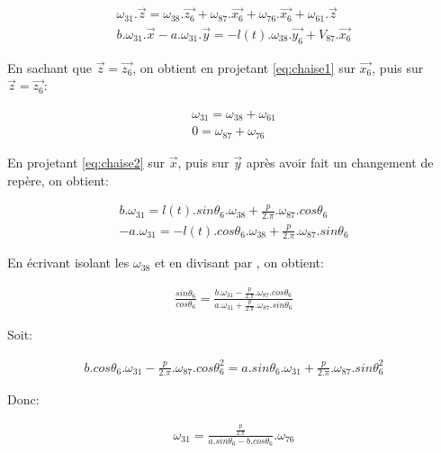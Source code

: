\begin{eqnarray}
\omega_{31}.\overrightarrow{z}=\omega_{38}.\overrightarrow{z_6}+\omega_{87}.\overrightarrow{x_6}+\omega_{76}.\overrightarrow{x_6}+\omega_{61}.\overrightarrow{z} \label{eq:chaise1} \\
b.\omega_{31}.\overrightarrow{x}-a.\omega_{31}.\overrightarrow{y}=-l(t).\omega_{38}.\overrightarrow{y_6}+V_{87}.\overrightarrow{x_6} \label{eq:chaise2} 
\end{eqnarray}

En sachant que $\overrightarrow{z}=\overrightarrow{z_6}$, on obtient en projetant \ref{eq:chaise1} sur $\overrightarrow{x_6}$, puis sur $\overrightarrow{z}=\overrightarrow{z_6}$:

\begin{eqnarray}
\omega_{31}=\omega_{38}+\omega_{61} \label{eq:chaise3} \\
0=\omega_{87}+\omega_{76} \label{eq:chaise4} 
\end{eqnarray}

En projetant \ref{eq:chaise2} sur $\overrightarrow{x}$, puis sur $\overrightarrow{y}$ après avoir fait un changement de repère, on obtient:

\begin{eqnarray}
b.\omega_{31}=l(t).sin\theta_6.\omega_{38}+\frac{p}{2.\pi}.\omega_{87}.cos\theta_6 \label{eq:chaise5} \\
-a.\omega_{31}=-l(t).cos\theta_6.\omega_{38}+\frac{p}{2.\pi}.\omega_{87}.sin\theta_6 \label{eq:chaise6}
\end{eqnarray}

En écrivant isolant les $\omega_{38}$ et en divisant \label{eq:chaise5} par \label{eq:chaise6}, on obtient:

\begin{eqnarray}
\frac{sin \theta_6}{cos \theta_6}=\frac{b.\omega_{31}-\frac{p}{2.\pi}.\omega_{87}.cos\theta_6 }{a.\omega_{31}+\frac{p}{2.\pi}.\omega_{87}.sin\theta_6} \label{eq:chaise7}
\end{eqnarray}

Soit:

\begin{eqnarray}
b.cos \theta_6.\omega_{31}-\frac{p}{2.\pi}.\omega_{87}.cos\theta_6^2=a.sin \theta_6.\omega_{31}+\frac{p}{2.\pi}.\omega_{87}.sin\theta_6^2 \label{eq:chaise8}
\end{eqnarray}

Donc:

\begin{eqnarray}
\omega_{31}=\frac{\frac{p}{2.\pi}}{a.sin\theta_6-b.cos\theta_6}.\omega_{76} \label{eq:chaise9}
\end{eqnarray}

